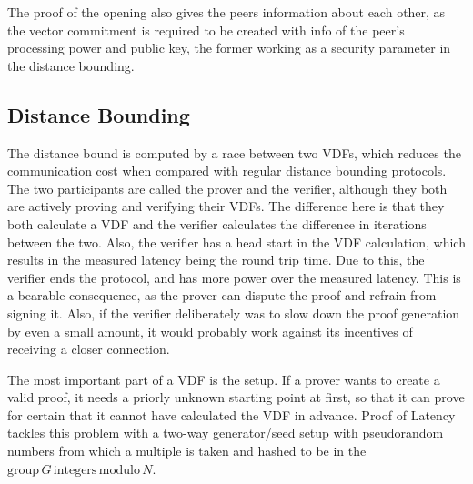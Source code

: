 The proof of the opening also gives the peers information about each other, as the vector commitment is required to be created with info of the peer's processing power and public key, the former working as a security parameter in the distance bounding. 

\subsection{Distance Bounding}
The distance bound is computed by a race between two VDFs, which reduces the communication cost when compared with regular distance bounding protocols. The two participants are called the prover and the verifier, although they both are actively proving and verifying their VDFs. The difference here is that they both calculate a VDF and the verifier calculates the difference in iterations between the two. Also, the verifier has a head start in the VDF calculation, which results in the measured latency being the round trip time. Due to this, the verifier ends the protocol, and has more power over the measured latency. This is a bearable consequence, as the prover can dispute the proof and refrain from signing it. Also, if the verifier deliberately was to slow down the proof generation by even a small amount, it would probably work against its incentives of receiving a closer connection.

The most important part of a VDF is the setup. If a prover wants to create a valid proof, it needs a priorly unknown starting point at first, so that it can prove for certain that it cannot have calculated the VDF in advance. Proof of Latency tackles this problem with a two-way generator/seed setup with pseudorandom numbers from which a multiple is taken and hashed to be in the \(\mathrm{group}\, G\, \mathrm{integers}\, \mathrm{modulo}\, N\).

